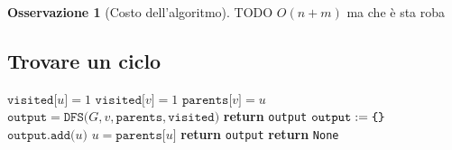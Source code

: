 \documentclass[14pt]{extreport}
\theoremstyle{definition}
\theoremstyle{definition}
\newtheorem{remark}{Osservazione}[subsection]
\begin{document}
\begin{remark}[Costo dell'algoritmo]
    TODO $O(n + m)$
    ma che è sta roba
\end{remark}

\subsection{Trovare un ciclo}

\begin{algorithm}[H]
    \caption{
        Dato un grafo indiretto $G$, rappresentato attraverso liste di adiacenza, l'algoritmo restituisce un suo ciclo, se presente.\\
        \textbf{Input}: $G$ grafo indiretto, rappresentato attraverso liste di adiacenza.\\
        \textbf{Output}: un ciclo di $G$, se presente.
    }

    \begin{algorithmic}[1]
            \State $\texttt{visited[}u\texttt{]} = 1$
                    \State $\texttt{visited[}v\texttt{]} = 1$
                    \State $\texttt{parents[}v\texttt{]} = u$
                    \State $\texttt{output} = \texttt{DFS(}G, v, \texttt{parents}, \texttt{visited)}$
                        \State \textbf{return} \texttt{output}
                    \EndIf
                     
                    \State $\texttt{output} := \verb|{| \verb|}|$
                        \State $\texttt{output.add(}u\texttt{)}$
                        \State $u = \texttt{parents[}u\texttt{]}$
                    \EndWhile
                    \State \textbf{return} \texttt{output}
                \EndIf
            \EndFor
            \State \textbf{return} \texttt{None}
        \EndFunction
    \end{algorithmic}
\end{algorithm}
\end{document}
